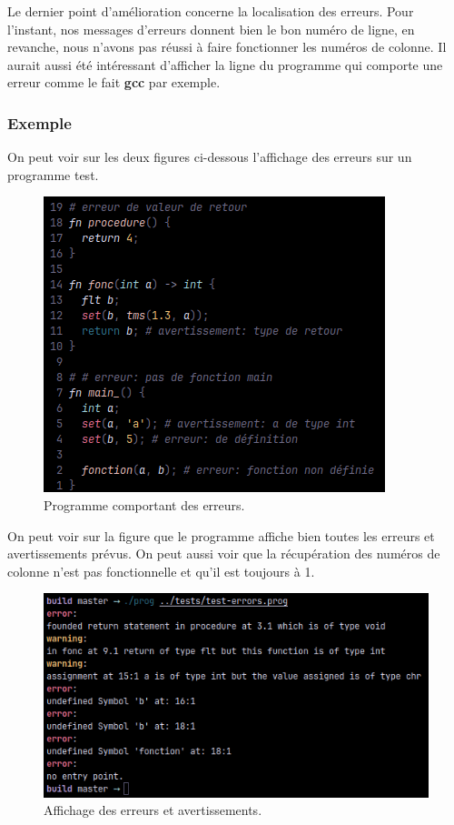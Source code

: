 \documentclass[a4paper]{article}%
\begin{document}
Le dernier point d'amélioration concerne la localisation des erreurs. Pour
l'instant, nos messages d'erreurs donnent bien le bon numéro de ligne, en
revanche, nous n'avons pas réussi à faire fonctionner les numéros de colonne. Il
aurait aussi été intéressant d'afficher la ligne du programme qui comporte une
erreur comme le fait \textbf{gcc} par exemple.\\

\subsubsection*{Exemple}

On peut voir sur les deux figures ci-dessous l'affichage des erreurs sur un
programme test.

\begin{figure}[h]
  \begin{center}
  \includegraphics[scale=0.7]{./img/err-prog.png}
  \caption{Programme comportant des erreurs.}
  \end{center}
\end{figure}

\clearpage
On peut voir sur la figure que le programme affiche bien toutes les erreurs et
avertissements prévus. On peut aussi voir que la récupération des numéros de
colonne n'est pas fonctionnelle et qu'il est toujours à 1.

\begin{figure}[h]
  \begin{center}
  \includegraphics[scale=0.7]{./img/err-prog-out.png}
  \caption{Affichage des erreurs et avertissements.}
  \end{center}
\end{figure}
\end{document}
